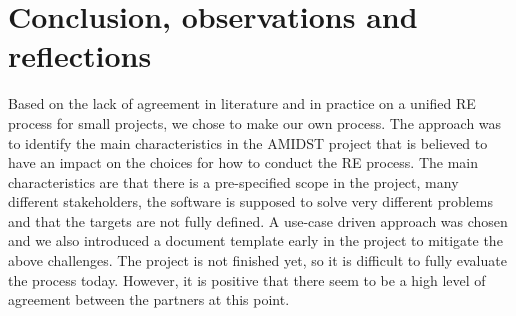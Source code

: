 \documentclass[11pt, oneside]{article}   	%
\begin{document}
\section{Conclusion, observations and reflections}
\label{sec:conclusion}

Based on the lack of agreement in literature and in practice on a unified RE process for small projects, we chose to make our own process.  The approach was to identify the main characteristics in the AMIDST project that is believed to have an impact on the choices for how to conduct the RE process.  The main characteristics are that there is a pre-specified scope in the project, many different stakeholders, the software is supposed to solve very different problems and that the targets are not fully defined.  A use-case driven approach was chosen and we also introduced a document template early in the project to mitigate the above challenges.  The project is not finished yet, so it is difficult to fully evaluate the process today.  However, it is positive that there seem to be a high level of agreement between the partners at this point.



\end{document}

